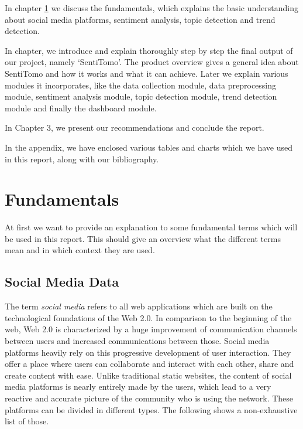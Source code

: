 \documentclass[11pt,titlepage,oneside,openany]{book}
\begin{document}
In chapter \ref{cha:fundamentals} we discuss the fundamentals, which explains the basic understanding about social media platforms, sentiment analysis, topic detection and trend detection.
		
In chapter, we introduce and explain thoroughly step by step the final output of our project, namely ‘SentiTomo’. The product overview gives a general idea about SentiTomo and how it works and what it can achieve. Later we explain various modules it incorporates, like the data collection module, data preprocessing module, sentiment analysis module, topic detection module, trend detection module and finally the dashboard module.
				
In Chapter 3, we present our recommendations and conclude the report.


In  the appendix, we have enclosed various tables and charts which we have used in this report, along with our bibliography.



\chapter{Fundamentals}
\label{cha:fundamentals}

At first we want to provide an explanation to some fundamental terms which will be used in this report. This should give an overview what the different terms mean and in which context they are used.

\section{Social Media Data}
\label{sec:scoial_media}

The term \textit{social media} refers to all web applications which are built on the technological foundations of the Web 2.0. In comparison to the beginning of the web, Web 2.0 is characterized by a huge improvement of communication channels between users and increased communications between those. Social media platforms heavily rely on this progressive development of user interaction. They offer a place where users can collaborate and interact with each other, share and create content with ease. Unlike traditional static websites, the content of social media platforms is nearly entirely made by the users, which lead to a very reactive and accurate picture of the community who is using the network. These platforms can be divided in different types. The following shows a non-exhaustive list of those. \cite{Rouse2016-09-15}\cite{Rouse2015-01-15}
\end{document}
